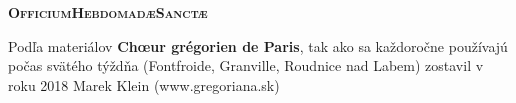 
\def \feria {A}
\def \feriashort {b}
\def \ohschaptername {c}
\let\feriashort\relax
\let\feria\relax
{}
\begin{center}\huge{\textbf{\textsc{Officium\linebreak Hebdomadæ\linebreak Sanctæ}}}\end{center}
\thispagestyle{empty}
\newpage{}

\clearpage
{}
\begin{center}
Podľa materiálov \textbf{Chœur grégorien de Paris}, 
\linebreak tak ako sa každoročne používajú počas svätého týždňa
\linebreak (Fontfroide, Granville, Roudnice nad Labem)
\linebreak zostavil v roku 2018 Marek Klein (www.gregoriana.sk)
\end{center}
\thispagestyle{empty}
\clearpage
\begin{comment}
\end{comment}


